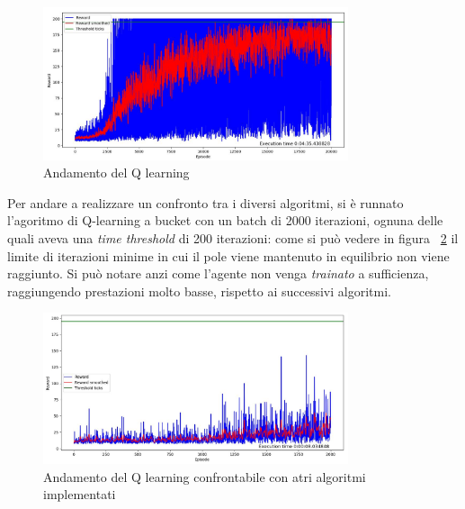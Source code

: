 \begin{figure}[!h]
	\centering
	\includegraphics[width=0.8\textwidth]{Immagini/reward_20K.JPG}
	\caption{Andamento del Q learning}
	\label{fig:QLearning_result}
\end{figure}

Per andare a realizzare un confronto tra i diversi algoritmi, si è runnato l'agoritmo di Q-learning a bucket con un batch di 2000 iterazioni, ognuna delle  quali aveva una \textit{time threshold} di 200 iterazioni: come si può vedere in figura ~\ref{fig:QLearning_poor_result} il limite di iterazioni minime in cui il pole viene mantenuto in equilibrio non viene raggiunto. Si può notare anzi come l'agente non venga \textit{trainato} a sufficienza, raggiungendo prestazioni molto basse, rispetto ai successivi algoritmi.

\begin{figure}[!h]
	\centering
	\includegraphics[width=0.8\textwidth]{Immagini/reward_2K.JPG}
	\caption{Andamento del Q learning confrontabile con atri algoritmi implementati}
	\label{fig:QLearning_poor_result}
\end{figure}

\newpage

